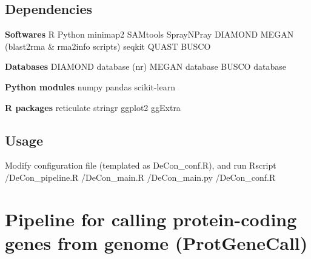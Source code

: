 \documentclass[11pt]{article}
\begin{document}
\begin{sloppypar}
\subsection{Dependencies}
\textbf{Softwares} \newline
R \newline
Python \newline
minimap2 \newline
SAMtools \newline
SprayNPray \newline
DIAMOND \newline
MEGAN (blast2rma & rma2info scripts) \newline
seqkit \newline
QUAST \newline
BUSCO \newline
\par
\textbf{Databases} \newline
DIAMOND database (nr) \newline
MEGAN database \newline
BUSCO database \newline
\par
\textbf{Python modules} \newline
numpy \newline
pandas \newline
scikit-learn \newline
\par
\textbf{R packages} \newline
reticulate \newline
stringr \newline
ggplot2 \newline
ggExtra \newline
\par
\subsection{Usage}
Modify configuration file (templated as DeCon\_conf.R), and run \newline
Rscript /DeCon\_pipeline.R /DeCon\_main.R /DeCon\_main.py /DeCon\_conf.R

\section{Pipeline for calling protein-coding genes from genome (ProtGeneCall)}

\end{sloppypar}
\end{document}
